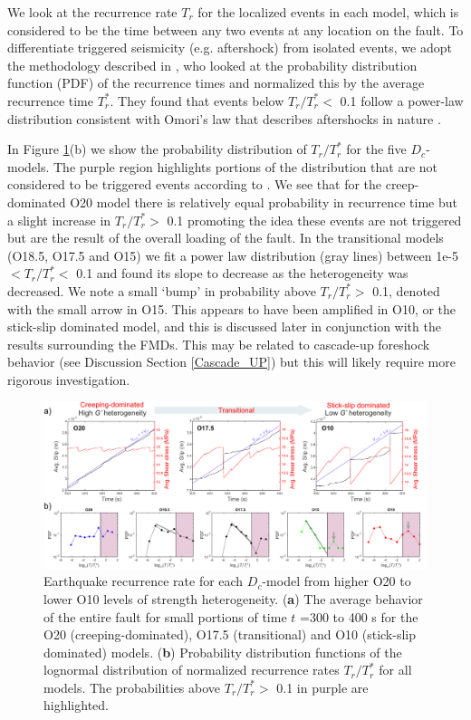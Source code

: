 \documentclass[preprint,1p, 10pt,authoryear]{elsarticle}
\begin{document}
We look at the recurrence rate $T_{r}$ for the localized events in each model, which is considered to be the time between any two events at any location on the fault. To differentiate triggered  seismicity (e.g. aftershock) from isolated events, we adopt the methodology described in \citet{Lengline2009}, who looked at the probability distribution function (PDF) of the recurrence times and normalized this by the average recurrence time $T^{*}_{r}$.  They found that events below $T_{r}/T^{*}_{r} <$ 0.1 follow a power-law distribution consistent with Omori's law that describes aftershocks in nature \citep[e.g.,][]{Lengline2009}. 

In Figure \ref{fig11}(b) we show the probability distribution of $T_{r}/T^{*}_{r}$ for the five $D_{c}$-models. The purple region highlights portions of the distribution that are not considered to be triggered events according to \citet{Lengline2009}. We see that for the creep-dominated O20 model there is relatively equal probability in recurrence time but a slight increase in  $T_{r}/T^{*}_{r} >$ 0.1 promoting the idea these events are not triggered but are the result of the overall loading of the fault. In the transitional models (O18.5, O17.5 and O15) we fit a power law distribution (gray lines) between 1e-5 $< T_{r}/T^{*}_{r} <$ 0.1 and found its slope to decrease as the heterogeneity was decreased. We note a small `bump' in probability above $T_{r}/T^{*}_{r} >$ 0.1, denoted with the small arrow in O15. This appears to have been amplified in O10, or the stick-slip dominated model, and this is discussed later in conjunction with the results surrounding the FMDs.  This may be related to cascade-up foreshock behavior (see Discussion Section \ref{Cascade_UP}) but this will likely require more rigorous investigation.

\begin{figure}
    	\centering
	\includegraphics[scale = 0.9]{FIG11_revised.pdf} 
	\caption{Earthquake recurrence rate for each $D_{c}$-model from higher O20 to lower O10 levels of strength heterogeneity. (\textbf{a}) The average behavior of the entire fault for small portions of time $t$ =300 to 400 s for the O20 (creeping-dominated), O17.5 (transitional) and O10 (stick-slip dominated) models. (\textbf{b}) Probability distribution functions of the lognormal distribution of normalized recurrence rates $T_{r}/T^{*}_{r}$ for all models. The probabilities above $T_{r}/T^{*}_{r} >$ 0.1 in purple are highlighted.}
	\label{fig11}
\end{figure}
\end{document}
